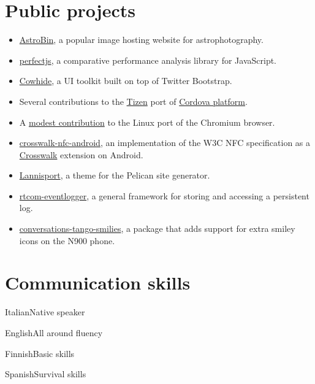 \documentclass[10pt]{tccv}
\begin{document}
		\section{Public projects}
			\begin{itemize}
				\item
					\href{http://astrobin.com}{AstroBin}, a popular image
					hosting website for astrophotography.

				\item
					\href{https://github.com/siovene/perfectjs}{perfectjs}, a
					comparative performance analysis library for JavaScript.

				\item
					\href{https://review.tizen.org/git/?p=profile/ivi/cowhide.git;a=summary}{Cowhide},
					a UI toolkit built on top of Twitter Bootstrap.

				\item
					Several contributions to the
					\href{http://tizen.org}{Tizen} port of
					\href{http://cordova.apache.org/}{Cordova platform}.

				\item
					A \href{https://codereview.chromium.org/170293004}{modest
					contribution} to the Linux port of the Chromium browser.

				\item
					\href{https://github.com/siovene/crosswalk-nfc-android}{crosswalk-nfc-android},
					an implementation of the W3C NFC specification as a
					\href{http://crosswalk.org}{Crosswalk} extension on
					Android.
				
				\item
					\href{https://github.com/siovene/lannisport}{Lannisport}, a
					theme for the Pelican site generator. 

				\item
					\href{http://maemo.org/api_refs/5.0/5.0-final/eventlogger/index.html}{rtcom-eventlogger},
					a general framework for storing and accessing a persistent
					log.

				\item
					\href{http://www.iovene.com/posts/2010/05/tango-smilies-for-conversations-on-the-nokia-n900/}{conversations-tango-smilies},
					a package that adds support for extra smiley icons on the
					N900 phone.
			\end{itemize}


		\section{Communication skills}
			\begin{factlist}
				\item{Italian}{Native speaker}
				\item{English}{All around fluency}
				\item{Finnish}{Basic skills}
				\item{Spanish}{Survival skills}
			\end{factlist}
\end{document}
